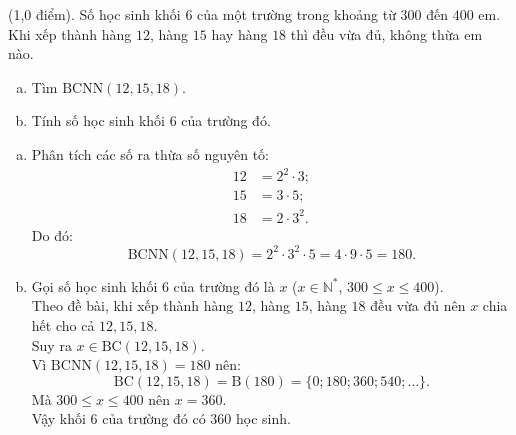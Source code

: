 \begin{bt}%
	(1,0 điểm).
	Số học sinh khối 6 của một trường trong khoảng từ $300$ đến $400$ em. Khi xếp thành hàng $12$, hàng $15$ hay hàng $18$ thì đều vừa đủ, không thừa em nào.
	\begin{enumerate}[a)]
		\item Tìm $\text{BCNN}(12, 15, 18)$.
		\item Tính số học sinh khối 6 của trường đó.
	\end{enumerate}
	\begin{loigiai}
		\begin{enumerate}[a)]
			\item Phân tích các số ra thừa số nguyên tố:
			\begin{align*}
				12 &= 2^2 \cdot 3;\\
				15 &= 3 \cdot 5;\\
				18 &= 2 \cdot 3^2.
			\end{align*}
			Do đó:
			\[ \text{BCNN}(12, 15, 18) = 2^2 \cdot 3^2 \cdot 5 = 4 \cdot 9 \cdot 5 = 180. \]
			\item Gọi số học sinh khối 6 của trường đó là $x$ ($x \in \mathbb{N}^*$, $300 \le x \le 400$).\\
			Theo đề bài, khi xếp thành hàng $12$, hàng $15$, hàng $18$ đều vừa đủ nên $x$ chia hết cho cả $12, 15, 18$.\\
			Suy ra $x \in \text{BC}(12, 15, 18)$.\\
			Vì $\text{BCNN}(12, 15, 18) = 180$ nên:
			\[ \text{BC}(12, 15, 18) = \text{B}(180) = \{0; 180; 360; 540; \dots\}. \]
			Mà $300 \le x \le 400$ nên $x = 360$.\\
			Vậy khối 6 của trường đó có $360$ học sinh.
		\end{enumerate}
	\end{loigiai}
\end{bt}

